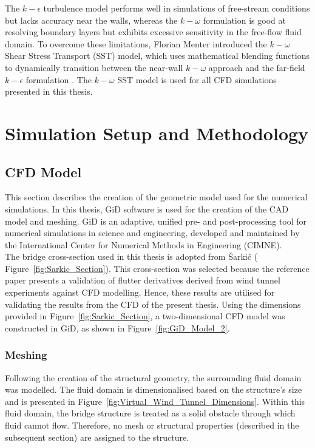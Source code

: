 \documentclass[../main]{subfiles}
\begin{document}
The $k-\epsilon$ turbulence model performs well in simulations of free-stream conditions but lacks accuracy near the walls, 
whereas the $k-\omega$ formulation is good at resolving boundary layers but exhibits excessive sensitivity in the free-flow 
fluid domain. To overcome these limitations, Florian Menter introduced the $k-\omega$ Shear Stress Transport 
(SST) model, which uses mathematical blending functions to dynamically transition between the near-wall $k-\omega$ 
approach and the far-field $k-\epsilon$ formulation \cite{menter}. The $k-\omega$ SST model is used for all CFD simulations presented in this thesis.

\section{Simulation Setup and Methodology}

\subsection{CFD Model} 
This section describes the creation of the geometric model used for the numerical simulations. 
In this thesis, GiD software is used for the creation of the CAD model and meshing. 
GiD is an adaptive, unified pre- and post-processing tool for 
numerical simulations in science and engineering, developed and maintained by the International Center for Numerical Methods in 
Engineering (CIMNE). \\

The bridge cross-section used in this thesis is adopted from \v{S}arki\'c \cite{sarkic2012} ( 
Figure~\ref{fig:Sarkic_Section}). This cross-section was selected because the reference paper presents a validation of 
flutter derivatives derived from wind tunnel experiments against CFD modelling. Hence, these results are utilised 
for validating the results from the CFD of the present thesis. 
Using the dimensions provided in Figure~\ref{fig:Sarkic_Section}, a two-dimensional CFD model was constructed in GiD, 
as shown in Figure~\ref{fig:GiD_Model_2}. 

\subsubsection{Meshing}

Following the creation of the structural geometry, the surrounding fluid domain was modelled. The fluid domain is 
dimensionalised based on the structure's size and is presented in Figure~\ref{fig:Virtual_Wind_Tunnel_Dimensions}. 
Within this fluid domain, the bridge structure is treated as a solid obstacle through which fluid cannot flow. 
Therefore, no mesh or structural properties (described in the subsequent section) are assigned to the structure. \\
\end{document}
